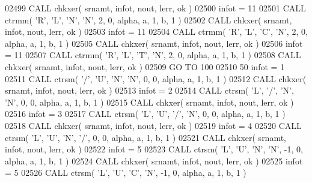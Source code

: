 \begin{DoxyCode}
02499       \textcolor{keyword}{CALL }chkxer( srnamt, infot, nout, lerr, ok )
02500       infot = 11
02501       \textcolor{keyword}{CALL }ctrmm( \textcolor{stringliteral}{'R'}, \textcolor{stringliteral}{'L'}, \textcolor{stringliteral}{'N'}, \textcolor{stringliteral}{'N'}, 2, 0, alpha, a, 1, b, 1 )
02502       \textcolor{keyword}{CALL }chkxer( srnamt, infot, nout, lerr, ok )
02503       infot = 11
02504       \textcolor{keyword}{CALL }ctrmm( \textcolor{stringliteral}{'R'}, \textcolor{stringliteral}{'L'}, \textcolor{stringliteral}{'C'}, \textcolor{stringliteral}{'N'}, 2, 0, alpha, a, 1, b, 1 )
02505       \textcolor{keyword}{CALL }chkxer( srnamt, infot, nout, lerr, ok )
02506       infot = 11
02507       \textcolor{keyword}{CALL }ctrmm( \textcolor{stringliteral}{'R'}, \textcolor{stringliteral}{'L'}, \textcolor{stringliteral}{'T'}, \textcolor{stringliteral}{'N'}, 2, 0, alpha, a, 1, b, 1 )
02508       \textcolor{keyword}{CALL }chkxer( srnamt, infot, nout, lerr, ok )
02509       \textcolor{keywordflow}{GO TO} 100
02510    50 infot = 1
02511       \textcolor{keyword}{CALL }ctrsm( \textcolor{stringliteral}{'/'}, \textcolor{stringliteral}{'U'}, \textcolor{stringliteral}{'N'}, \textcolor{stringliteral}{'N'}, 0, 0, alpha, a, 1, b, 1 )
02512       \textcolor{keyword}{CALL }chkxer( srnamt, infot, nout, lerr, ok )
02513       infot = 2
02514       \textcolor{keyword}{CALL }ctrsm( \textcolor{stringliteral}{'L'}, \textcolor{stringliteral}{'/'}, \textcolor{stringliteral}{'N'}, \textcolor{stringliteral}{'N'}, 0, 0, alpha, a, 1, b, 1 )
02515       \textcolor{keyword}{CALL }chkxer( srnamt, infot, nout, lerr, ok )
02516       infot = 3
02517       \textcolor{keyword}{CALL }ctrsm( \textcolor{stringliteral}{'L'}, \textcolor{stringliteral}{'U'}, \textcolor{stringliteral}{'/'}, \textcolor{stringliteral}{'N'}, 0, 0, alpha, a, 1, b, 1 )
02518       \textcolor{keyword}{CALL }chkxer( srnamt, infot, nout, lerr, ok )
02519       infot = 4
02520       \textcolor{keyword}{CALL }ctrsm( \textcolor{stringliteral}{'L'}, \textcolor{stringliteral}{'U'}, \textcolor{stringliteral}{'N'}, \textcolor{stringliteral}{'/'}, 0, 0, alpha, a, 1, b, 1 )
02521       \textcolor{keyword}{CALL }chkxer( srnamt, infot, nout, lerr, ok )
02522       infot = 5
02523       \textcolor{keyword}{CALL }ctrsm( \textcolor{stringliteral}{'L'}, \textcolor{stringliteral}{'U'}, \textcolor{stringliteral}{'N'}, \textcolor{stringliteral}{'N'}, -1, 0, alpha, a, 1, b, 1 )
02524       \textcolor{keyword}{CALL }chkxer( srnamt, infot, nout, lerr, ok )
02525       infot = 5
02526       \textcolor{keyword}{CALL }ctrsm( \textcolor{stringliteral}{'L'}, \textcolor{stringliteral}{'U'}, \textcolor{stringliteral}{'C'}, \textcolor{stringliteral}{'N'}, -1, 0, alpha, a, 1, b, 1 )

\end{DoxyCode}
